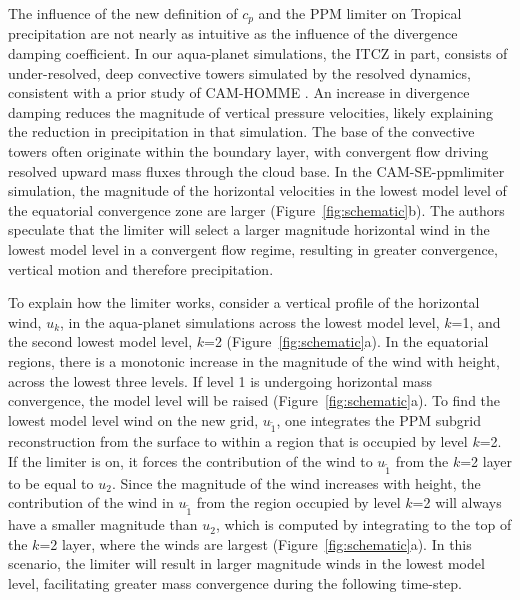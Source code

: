The influence of the new definition of $c_p$ and the PPM limiter on Tropical precipitation are not nearly as intuitive as the influence of the divergence damping coefficient. In our aqua-planet simulations, the ITCZ in part, consists of under-resolved, deep convective towers simulated by the resolved dynamics, consistent with a prior study of CAM-HOMME \citep{HR2017JCLIM}. An increase in divergence damping reduces the magnitude of vertical pressure velocities, likely explaining the reduction in precipitation in that simulation. The base of the convective towers often originate within the boundary layer, with convergent flow driving resolved upward mass fluxes through the cloud base. In the CAM-SE-ppmlimiter simulation, the magnitude of the horizontal velocities in the lowest model level of the equatorial convergence zone are larger (Figure~\ref{fig:schematic}b). The authors speculate that the limiter will select a larger magnitude horizontal wind in the lowest model level in a convergent flow regime, resulting in greater convergence, vertical motion and therefore precipitation. 

To explain how the limiter works, consider a vertical profile of the horizontal wind, $u_k$, in the aqua-planet simulations across the lowest model level, $k$=1, and the second lowest model level, $k$=2 (Figure~\ref{fig:schematic}a). In the equatorial regions, there is a monotonic increase in the magnitude of the wind with height, across the lowest three levels. If level 1 is undergoing horizontal mass convergence, the model level will be raised (Figure~\ref{fig:schematic}a). To find the lowest model level wind on the new grid, $u_{\tilde 1}$, one integrates the PPM subgrid reconstruction from the surface to within a region that is occupied by level $k$=2. If the limiter is on, it forces the contribution of the wind to $u_{\tilde 1}$ from the $k$=2 layer to be equal to $u_2$. Since the magnitude of the wind increases with height, the contribution of the wind in $u_{\tilde 1}$ from the region occupied by level $k$=2 will always have a smaller magnitude than $u_2$, which is computed by integrating to the top of the $k$=2 layer, where the winds are largest (Figure~\ref{fig:schematic}a). In this scenario, the limiter will result in larger magnitude winds in the lowest model level, facilitating greater mass convergence during the following time-step.    

